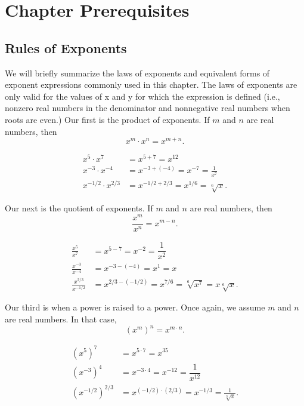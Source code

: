 \section{Chapter Prerequisites}
\label{sec:deriv_prereqs}

\prereqIntro

\subsection{Rules of Exponents}

We will briefly summarize the laws of exponents and equivalent forms of exponent expressions commonly used in this chapter.  The laws of exponents are only valid for the values of x and y for which the expression is defined (i.e., nonzero real numbers in the denominator and nonnegative real numbers when roots are even.) Our first is the product of exponents.  If $m$ and $n$ are real numbers, then
\[x^m\cdot x^n=x^{m+n}.\]

\begin{example}\label{prereq_exp_prod}
\mbox{}\vspace{-\baselineskip}
\begin{align*}
 x^5 \cdot x^7 &= x^{5+7}=x^{12} \\
 x^{-3}\cdot x^{-4} &= x^{-3+(-4)}=x^{-7}=\frac1{x^7} \\
 x^{-1/2}\cdot x^{2/3} &= x^{-1/2+2/3}=x^{1/6}=\sqrt[6]{x}.
\end{align*}
\end{example}

Our next is the quotient of exponents.  If $m$ and $n$ are real numbers, then
\[\frac{x^m}{x^n}=x^{m-n}.\]

\begin{example}\label{prereq_exp_quot}
\mbox{}\vspace{-\baselineskip}
\begin{align*}
 \frac{x^5}{x^7} &= x^{5-7}=x^{-2}=\dfrac1{x^2} \\
 \frac{x^{-3}}{x^{-4}} &= x^{-3-(-4)}=x^{1}=x \\
 \frac{x^{2/3}}{x^{-1/2}}
 &= x^{2/3-(-1/2)}=x^{7/6}=\sqrt[6]{x^7}=x\sqrt[6]{x}.
\end{align*}
\end{example}

Our third is when a power is raised to a power.  Once again, we assume $m$ and $n$ are real numbers.  In that case,
\[(x^m)^n=x^{m\cdot n}.\]

\begin{example}\label{prereq_exp_pow}
\vspace{-\baselineskip}
\begin{align*}
 (x^5)^7 &= x^{5\cdot 7}=x^{35} \\
 (x^{-3})^4 &= x^{-3\cdot4}=x^{-12}=\dfrac1{x^{12}} \\
 (x^{-1/2})^{2/3} &= x^{(-1/2)\cdot(2/3)}=x^{-1/3}=\frac1{\sqrt[3]{x}}.
\end{align*}
\end{example}

